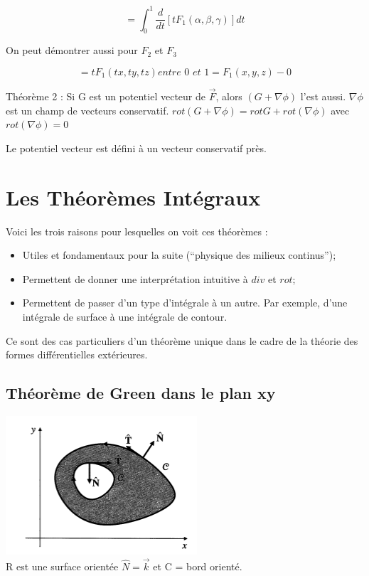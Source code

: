 \[=\int_0^1 \frac{d}{dt}[t F_1 ( \alpha, \beta, \gamma ) ] dt \]

On peut démontrer aussi pour $F_2 $ et $F_3$

\[ = tF_1 ( tx,ty,tz) \textit{entre 0 et 1} = F_1 (x,y,z) - 0\]

\begin{myrem}

Théorème 2 : Si G est un potentiel vecteur de $\vec F$, alors $(G+\nabla \phi )$ l'est aussi. $\nabla \phi$ est un champ de vecteurs conservatif.
$rot ( G+\nabla \phi )  = rot G + rot ( \nabla  \phi )$ avec $rot ( \nabla  \phi )=0$
\end{myrem}


Le potentiel vecteur est défini à un vecteur conservatif près.

\section{Les Théorèmes Intégraux}


Voici les trois raisons pour lesquelles on voit ces théorèmes :
\begin{itemize}
\item Utiles et fondamentaux pour la suite (``physique des milieux continus'');
\item Permettent de donner une interprétation intuitive à $div$ et $rot$;
\item Permettent de passer d'un type d'intégrale à un autre. Par exemple, d'une intégrale de surface à une intégrale de contour.
\end{itemize}

Ce sont des cas particuliers d'un théorème unique dans le cadre de la théorie des formes différentielles extérieures.

\subsection{Théorème de Green dans le plan xy}

\includegraphics[scale=1]{image3.png}
\\
R est une surface orientée $ \hat N = \vec k$ et C = bord orienté.

